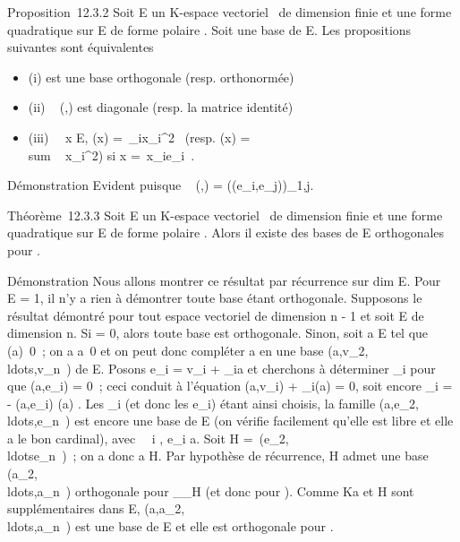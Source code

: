 \documentclass[]{article}
\begin{document}
Proposition~12.3.2 Soit E un K-espace vectoriel ~de dimension finie et \Phi
une forme quadratique sur E de forme polaire \phi. Soit  une base de E.
Les propositions suivantes sont équivalentes

\begin{itemize}
\itemsep1pt\parskip0pt
\item
  (i)  est une base orthogonale (resp. orthonormée)
\item
  (ii) \mathrmMat~ (\phi,) est
  diagonale (resp. la matrice identité)
\item
  (iii) \forall~~x \in E, \Phi(x) =\
  \sum  \alpha_ix_i^2~
  (resp. \Phi(x) = \\sum ~
  x_i^2) si x =\
  \sum  x_ie_i~.
\end{itemize}

Démonstration Evident puisque
\mathrmMat~ (\phi,) =
(\phi(e_i,e_j))_1\leqi,j\leqn.

Théorème~12.3.3 Soit E un K-espace vectoriel ~de dimension finie et \Phi
une forme quadratique sur E de forme polaire \phi. Alors il existe des
bases de E orthogonales pour \phi.

Démonstration Nous allons montrer ce résultat par récurrence sur
dim E. Pour \dim~ E =
1, il n'y a rien à démontrer toute base étant orthogonale. Supposons le
résultat démontré pour tout espace vectoriel de dimension n - 1 et soit
E de dimension n. Si \Phi = 0, alors toute base est orthogonale. Sinon,
soit a \in E tel que \Phi(a)\neq~0~; on a
a\neq~0 et on peut donc compléter a en une base
(a,v_2,\\ldots,v_n~)
de E. Posons e_i = v_i + \lambda_ia et cherchons à
déterminer \lambda_i pour que \phi(a,e_i) = 0~; ceci conduit à
l'équation \phi(a,v_i) + \lambda_i\Phi(a) = 0, soit encore
\lambda_i = - \phi(a,e_i) \over \Phi(a) . Les
\lambda_i (et donc les e_i) étant ainsi choisis, la famille
(a,e_2,\\ldots,e_n~)
est encore une base de E (on vérifie facilement qu'elle est libre et
elle a le bon cardinal), avec \forall~~i \in [2,n],
e_i \bot a. Soit H =\
\mathrmVect(e_2,\\ldotse_n~)~;
on a donc a \bot H. Par hypothèse de récurrence, H admet une base
(a_2,\\ldots,a_n~)
orthogonale pour \Phi__H (et donc pour \Phi).
Comme Ka et H sont supplémentaires dans E,
(a,a_2,\\ldots,a_n~)
est une base de E et elle est orthogonale pour \phi.
\end{document}

